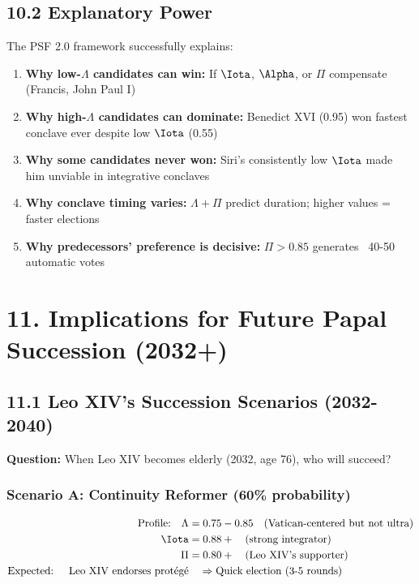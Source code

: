\documentclass[11pt]{article}
\begin{document}
\subsection{10.2 Explanatory Power}

The PSF 2.0 framework successfully explains:

\begin{enumerate}
\item \textbf{Why low-$\Lambda$ candidates can win:} If $\Iota$, $\Alpha$, or $\Pi$ compensate (Francis, John Paul I)

\item \textbf{Why high-$\Lambda$ candidates can dominate:} Benedict XVI (0.95) won fastest conclave ever despite low $\Iota$ (0.55)

\item \textbf{Why some candidates never won:} Siri's consistently low $\Iota$ made him unviable in integrative conclaves

\item \textbf{Why conclave timing varies:} $\Lambda + \Pi$ predict duration; higher values = faster elections

\item \textbf{Why predecessors' preference is decisive:} $\Pi > 0.85$ generates ~40-50 automatic votes

\end{enumerate}

\section{11. Implications for Future Papal Succession (2032+)}

\subsection{11.1 Leo XIV's Succession Scenarios (2032-2040)}

\textbf{Question:} When Leo XIV becomes elderly (2032, age 76), who will succeed?

\subsubsection{Scenario A: Continuity Reformer (60\% probability)}
\begin{align*}
\text{Profile:} \quad \Lambda &= 0.75-0.85 \quad \text{(Vatican-centered but not ultra)} \\
\Iota &= 0.88+ \quad \text{(strong integrator)} \\
\Pi &= 0.80+ \quad \text{(Leo XIV's supporter)} \\
\text{Expected: } \quad \text{Leo XIV endorses protégé} &\quad \Rightarrow \text{Quick election (3-5 rounds)}
\end{align*}
\end{document}
